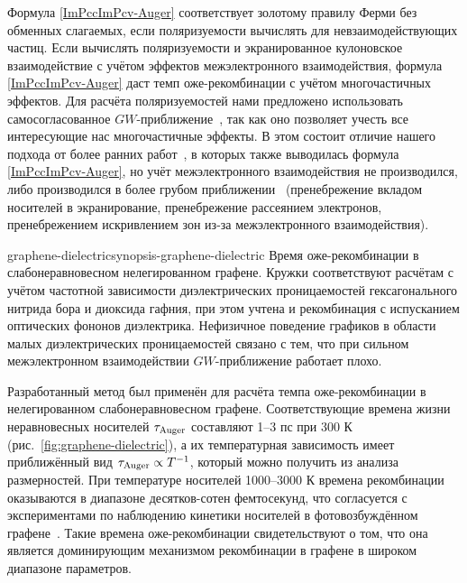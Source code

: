 Формула \eqref{ImPccImPcv-Auger} соответствует золотому правилу Ферми без обменных слагаемых, если поляризуемости вычислять для невзаимодействующих частиц. Если вычислять поляризуемости и экранированное кулоновское взаимодействие с учётом эффектов межэлектронного взаимодействия, формула \eqref{ImPccImPcv-Auger} даст темп оже-рекомбинации с учётом многочастичных эффектов. Для расчёта поляризуемостей нами предложено использовать самосогласованное $GW$-приближение~\cite{NEGF-GW}, так как оно позволяет учесть все интересующие нас многочастичные эффекты. В этом состоит отличие нашего подхода от более ранних работ~\cite{Ziep-Mocker}, в которых также выводилась формула \eqref{ImPccImPcv-Auger}, но учёт межэлектронного взаимодействия не производился, либо производился в более грубом приближении~\cite{Auger_scattering} (пренебрежение вкладом носителей в экранирование, пренебрежение рассеянием электронов, пренебрежением искривлением зон из-за межэлектронного взаимодействия).
%
   
\begin{narrowfig}{graphene-dielectric}{synopsis-graphene-dielectric}
Время оже-рекомбинации в слабонеравновесном нелегированном графене. Кружки соответствуют расчётам с учётом частотной зависимости диэлектрических проницаемостей гексагонального нитрида бора и диоксида гафния, при этом учтена и рекомбинация с испусканием оптических фононов диэлектрика. Нефизичное поведение графиков в области малых диэлектрических проницаемостей связано с тем, что при сильном межэлектронном взаимодействии $GW$-приближение работает плохо.
\end{narrowfig}

Разработанный метод был применён для расчёта темпа оже-рекомбинации в нелегированном слабонеравновесном графене. Соответствующие времена жизни неравновесных носителей $\tau_{\rm Auger}$ составляют 1--3 пс при 300 К (рис.~\ref{fig:graphene-dielectric}), а их температурная зависимость имеет приближённый вид $\tau_{\rm Auger} \propto T^{-1}$, который можно получить из анализа размерностей. При температуре носителей 1000--3000 К времена рекомбинации оказываются в диапазоне десятков-сотен фемтосекунд, что согласуется с экспериментами по наблюдению кинетики носителей в фотовозбуждённом графене~\cite{Gierz2013}. Такие времена оже-рекомбинации свидетельствуют о том, что она является доминирующим механизмом рекомбинации в графене в широком диапазоне параметров.

